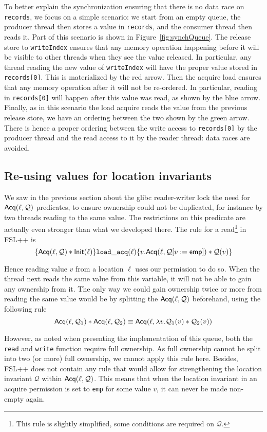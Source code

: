 To better explain the synchronization ensuring that there is no data race on \texttt{records}, we focus on a simple scenario: we start from an empty queue, the producer thread then stores a value in \texttt{records}, and the consumer thread then reads it. Part of this scenario is shown in Figure~\ref{fig:synchQueue}. The release store to \texttt{writeIndex} ensures that any memory operation happening before it will be visible to other threads when they see the value released. In particular, any thread reading the new value of \texttt{writeIndex} will have the proper value stored in \texttt{records[0]}. This is materialized by the red arrow. Then the acquire load ensures that any memory operation after it will not be re-ordered. In particular, reading in \texttt{records[0]} will happen after this value was read, as shown by the blue arrow. Finally, as in this scenario the load acquire reads the value from the previous release store, we have an ordering between the two shown by the green arrow. There is hence a proper ordering between the write access to \texttt{records[0]} by the producer thread and the read access to it by the reader thread: data races are avoided.

\subsection{Re-using values for location invariants}
We saw in the previous section about the glibc reader-writer lock the need for $\operatorname{\mathsf{Acq}}(\ell, \mathcal{Q})$ predicates, to ensure ownership could not be duplicated, for instance by two threads reading to the same value. The restrictions on this predicate are actually even stronger than what we developed there. The rule for a read\footnote{This rule is slightly simplified, some conditions are required on $\mathcal{Q}$.} in FSL++ is 
\[
		\{\operatorname{\mathsf{Acq}}(\ell, \mathcal{Q}) * \mathsf{Init(\ell)}\} \mathtt{load\_acq}(\ell) \{v.\mathsf{Acq}(\ell, \mathcal{Q}[v:=\mathsf{emp}]) * \mathcal{Q}(v)\}
\]

Hence reading value $v$ from a location $\ell$ uses our permission to do so. When the thread next reads the same value from this variable, it will not be able to gain any ownership from it. The only way we could gain ownership twice or more from reading the same value would be by splitting the $\operatorname{\mathsf{Acq}}(\ell, \mathcal{Q})$ beforehand, using the following rule
\[
		\operatorname{\mathsf{Acq}}(\ell, \mathcal{Q}_{1}) * \operatorname{\mathsf{Acq}}(\ell, \mathcal{Q}_{2}) \equiv \mathsf{Acq}(\ell, \lambda v. \mathcal{Q}_1(v) * \mathcal{Q}_2(v))
\]

However, as noted when presenting the implementation of this queue, both the \texttt{read} and \texttt{write} function require full ownership. As full ownership cannot be split into two (or more) full ownership, we cannot apply this rule here. Besides, FSL++ does not contain any rule that would allow for strengthening the location invariant $\mathcal{Q}$ within $\operatorname{\mathsf{Acq}}(\ell, \mathcal{Q})$. This means that when the location invariant in an acquire permission is set to \texttt{emp} for some value $v$, it can never be made non-empty again. 

